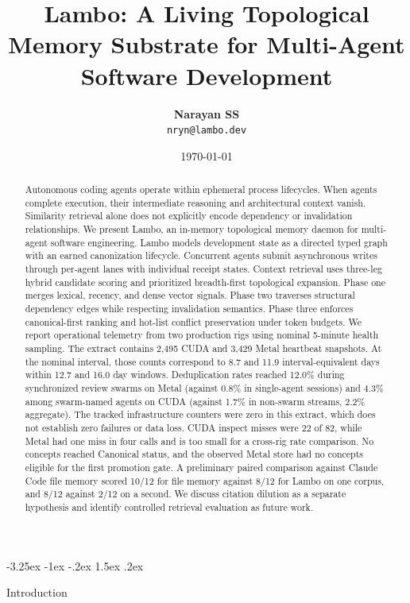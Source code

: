 \documentclass[10pt,twocolumn]{article}
\title{\textbf{Lambo: A Living Topological Memory Substrate for Multi-Agent Software Development}}
\author{
  \textbf{Narayan SS}\\
  \texttt{nryn@lambo.dev}
}
\date{\today}
\makeatletter
\renewcommand\section{\@startsection{section}{1}{\z@}%
  {-3.25ex \@plus -1ex \@minus -.2ex}%
  {1.5ex \@plus .2ex}%
  {\normalfont\large\bfseries\raggedright}}
\makeatother
\begin{document}
\maketitle

\begin{abstract}
Autonomous coding agents operate within ephemeral process lifecycles.
When agents complete execution, their intermediate reasoning and architectural context vanish.
Similarity retrieval alone does not explicitly encode dependency or invalidation relationships.
We present Lambo, an in-memory topological memory daemon for multi-agent software engineering.
Lambo models development state as a directed typed graph with an earned canonization lifecycle.
Concurrent agents submit asynchronous writes through per-agent lanes with individual receipt states.
Context retrieval uses three-leg hybrid candidate scoring and prioritized breadth-first topological expansion.
Phase one merges lexical, recency, and dense vector signals.
Phase two traverses structural dependency edges while respecting invalidation semantics.
Phase three enforces canonical-first ranking and hot-list conflict preservation under token budgets.
We report operational telemetry from two production rigs using nominal 5-minute health sampling.
The extract contains 2,495 CUDA and 3,429 Metal heartbeat snapshots. At the nominal interval, those counts correspond to 8.7 and 11.9 interval-equivalent days within 12.7 and 16.0 day windows.
Deduplication rates reached 12.0\% during synchronized review swarms on Metal (against 0.8\% in single-agent sessions) and 4.3\% among swarm-named agents on CUDA (against 1.7\% in non-swarm streams, 2.2\% aggregate).
The tracked infrastructure counters were zero in this extract, which does not establish zero failures or data loss.
CUDA inspect misses were 22 of 82, while Metal had one miss in four calls and is too small for a cross-rig rate comparison.
No concepts reached Canonical status, and the observed Metal store had no concepts eligible for the first promotion gate.
A preliminary paired comparison against Claude Code file memory scored 10/12 for file memory against 8/12 for Lambo on one corpus, and 8/12 against 2/12 on a second.
We discuss citation dilution as a separate hypothesis and identify controlled retrieval evaluation as future work.
\end{abstract}

\section{Introduction}
\end{document}
